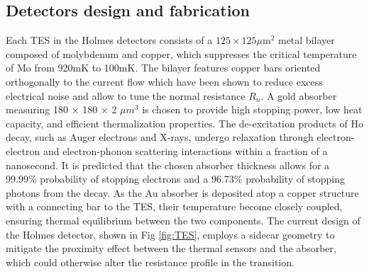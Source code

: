 \subsection{Detectors design and fabrication}\label{sec:fabrication}
Each TES in the Holmes detectors consists of a $125\times125\mu \text{m}^2$ metal bilayer composed of molybdenum
and copper, which suppresses the critical temperature of Mo from 920mK to 100mK. The bilayer features copper bars
oriented orthogonally to the current flow which have been shown to reduce excess electrical noise and allow to tune the
normal resistance $R_n$.
A gold absorber measuring 180 × 180 × 2 $\mu m^3$ is chosen to provide high stopping power, low heat capacity, and efficient
thermalization properties. The de-excitation products of Ho decay, such as Auger electrons and X-rays, undergo
relaxation through electron-electron and electron-phonon scattering interactions within a fraction of a nanosecond. It is
predicted that the chosen absorber thickness allows for a 99.99\% probability of stopping electrons and a 96.73\%
probability of stopping photons from the decay.
As the Au absorber is deposited atop a copper structure with a connecting bar to the TES, their temperature become closely coupled, ensuring thermal equilibrium between the two components.
The current design of the Holmes detector, shown in Fig \ref{fig:TES}, employs a sidecar geometry to mitigate the proximity effect between the
thermal sensors and the absorber, which could otherwise alter the resistance profile in the transition.


